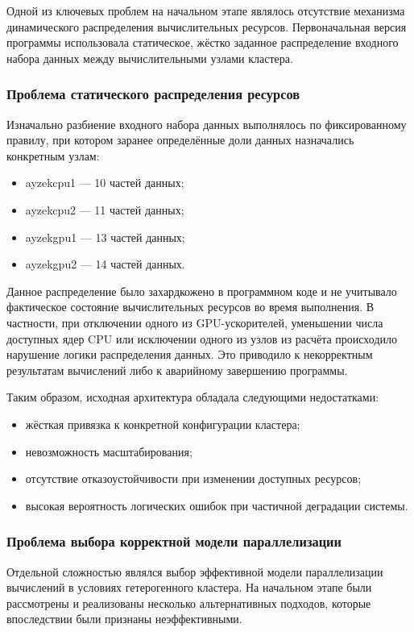 \documentclass[areaset=advanced]{scrartcl}
\begin{document}
Одной из ключевых проблем на начальном этапе являлось отсутствие механизма
динамического распределения вычислительных ресурсов. Первоначальная версия
программы использовала статическое, жёстко заданное распределение входного
набора данных между вычислительными узлами кластера.
\subsubsection{Проблема статического распределения ресурсов}
Изначально разбиение входного набора данных выполнялось по фиксированному правилу,
при котором заранее определённые доли данных назначались конкретным узлам:
\begin{itemize}
    \item ayzekcpu1 — 10 частей данных;
    \item ayzekcpu2 — 11 частей данных;
    \item ayzekgpu1 — 13 частей данных;
    \item ayzekgpu2 — 14 частей данных.
\end{itemize}

Данное распределение было захардкожено в программном коде и не учитывало
фактическое состояние вычислительных ресурсов во время выполнения.
В частности, при отключении одного из GPU-ускорителей, уменьшении числа доступных
ядер CPU или исключении одного из узлов из расчёта происходило нарушение логики
распределения данных. Это приводило к некорректным результатам вычислений либо
к аварийному завершению программы.

Таким образом, исходная архитектура обладала следующими недостатками:
\begin{itemize}
    \item жёсткая привязка к конкретной конфигурации кластера;
    \item невозможность масштабирования;
    \item отсутствие отказоустойчивости при изменении доступных ресурсов;
    \item высокая вероятность логических ошибок при частичной деградации системы.
\end{itemize}

\subsubsection{Проблема выбора корректной модели параллелизации}
Отдельной сложностью являлся выбор эффективной модели параллелизации вычислений
в условиях гетерогенного кластера. На начальном этапе были рассмотрены и
реализованы несколько альтернативных подходов, которые впоследствии были признаны
неэффективными.
\end{document}
